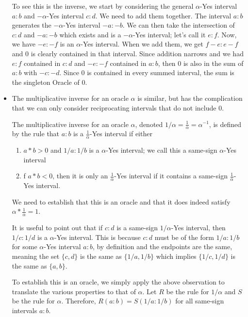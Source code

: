 \documentclass[12pt]{article}
\theoremstyle{remark}
\begin{document}
\begin{itemize}
    To see this is the inverse, we start by considering the general $\alpha$-Yes interval $a:b$ and $-\alpha$-Yes interval $c:d$. We need to add them together. The interval $a:b$ generates the $-\alpha$-Yes interval $-a:-b$. We can then take the intersection of $c:d$ and $-a:-b$ which exists and is a $-\alpha$-Yes interval; let's call it $e:f$. Now, we have $-e:-f$ is an $\alpha$-Yes interval. When we add them, we get $f-e:e-f$ and $0$ is clearly contained in that interval. Since addition narrows and we had $e:f$ contained in $c:d$ and $-e:-f$ contained in $a:b$, then $0$ is also in the sum of $a:b$ with $-c:-d$. Since $0$ is contained in every summed interval, the sum is the singleton Oracle of $0$. 
    
    \item The multiplicative inverse for an oracle $\alpha$ is similar, but has the complication that we can only consider reciprocating intervals that do not include 0. 
    
    The multiplicative inverse for an oracle $\alpha$, denoted $1/\alpha = \frac{1}{\alpha} = \alpha^{-1}$, is defined by the rule that $a:b$ is a $\frac{1}{\alpha}$-Yes interval if either 
    
    \begin{enumerate}
        \item  $a*b > 0$  and $1/a:1/b$ is a $\alpha$-Yes interval; we call this a same-sign $\alpha$-Yes interval
        \item f $a*b<0$, then it is only an $\frac{1}{\alpha}$-Yes interval if it contains a same-sign $\frac{1}{\alpha}$-Yes interval. 
    \end{enumerate}
    
    We need to establish that this is an oracle and that it does indeed satisfy $\alpha * \frac{1}{\alpha} = 1$.
    
    It is useful to point out that if $c:d$ is a same-sign $1/\alpha$-Yes interval, then $1/c:1/d$ is a $\alpha$-Yes interval. This is because $c:d$ must be of the form $1/a:1/b$ for some $\alpha$-Yes interval $a:b$, by definition and the endpoints are the same, meaning the set $\{c,d\}$ is the same as $\{1/a, 1/b\}$ which implies $\{1/c, 1/d\}$ is the same as $\{a, b\}$.
    
    To establish this is an oracle, we simply apply the above observation to translate the various properties to that of $\alpha$. Let $R$ be the rule for $1/\alpha$ and $S$ be the rule for $\alpha$. Therefore, $R(a:b)=S(1/a:1/b)$ for all same-sign intervals $a:b$.
    

\end{itemize}
\end{document}
